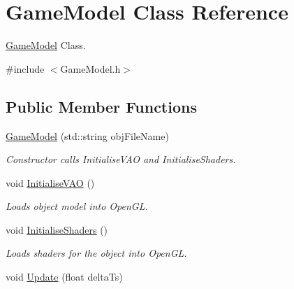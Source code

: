 \hypertarget{class_game_model}{\section{Game\+Model Class Reference}
\label{class_game_model}
}


\hyperlink{class_game_model}{Game\+Model} Class.  




{\ttfamily \#include $<$Game\+Model.\+h$>$}

\subsection*{Public Member Functions}
\begin{DoxyCompactItemize}
\item 
\hypertarget{class_game_model_a93c7eafa927281cdb06a6aee39ab3d70}{\hyperlink{class_game_model_a93c7eafa927281cdb06a6aee39ab3d70}{Game\+Model} (std\+::string obj\+File\+Name)}\label{class_game_model_a93c7eafa927281cdb06a6aee39ab3d70}

\begin{DoxyCompactList}\small\item\em Constructor calls Initialise\+V\+A\+O and Initialise\+Shaders. \end{DoxyCompactList}\item 
\hypertarget{class_game_model_a7cf6fff27a3de40c84244b08b8136a23}{void \hyperlink{class_game_model_a7cf6fff27a3de40c84244b08b8136a23}{Initialise\+V\+A\+O} ()}\label{class_game_model_a7cf6fff27a3de40c84244b08b8136a23}

\begin{DoxyCompactList}\small\item\em Loads object model into Open\+G\+L. \end{DoxyCompactList}\item 
\hypertarget{class_game_model_a6e3b9a7dcddd4291c8aedc6977dc8827}{void \hyperlink{class_game_model_a6e3b9a7dcddd4291c8aedc6977dc8827}{Initialise\+Shaders} ()}\label{class_game_model_a6e3b9a7dcddd4291c8aedc6977dc8827}

\begin{DoxyCompactList}\small\item\em Loads shaders for the object into Open\+G\+L. \end{DoxyCompactList}\item 
\hypertarget{class_game_model_a102fb1dfb4781b5a5e7ea8ce8b9d9add}{void \hyperlink{class_game_model_a102fb1dfb4781b5a5e7ea8ce8b9d9add}{Update} (float delta\+Ts)}\label{class_game_model_a102fb1dfb4781b5a5e7ea8ce8b9d9add}


\end{DoxyCompactItemize}
